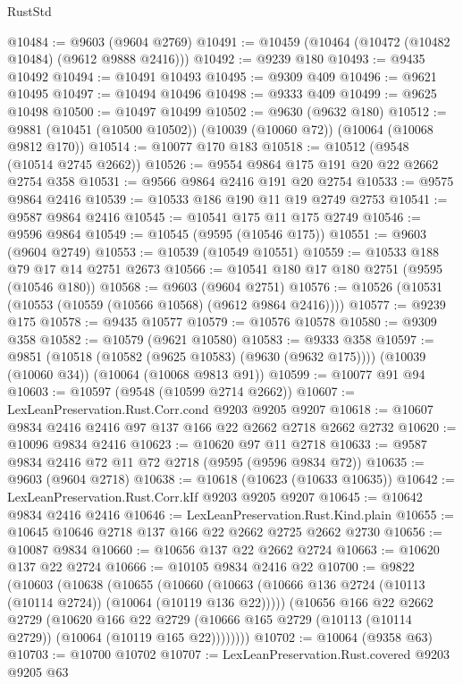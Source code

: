 \begin{lexlean}{RustStd}
\begin{coremodule}
@10484 := @9603 (@9604 @2769)
@10491 := @10459 (@10464 (@10472 (@10482 @10484) (@9612 @9888 @2416)))
@10492 := @9239 @180
@10493 := @9435 @10492
@10494 := @10491 @10493
@10495 := @9309 @409
@10496 := @9621 @10495
@10497 := @10494 @10496
@10498 := @9333 @409
@10499 := @9625 @10498
@10500 := @10497 @10499
@10502 := @9630 (@9632 @180)
@10512 := @9881 (@10451 (@10500 @10502)) (@10039 (@10060 @72)) (@10064 (@10068 @9812 @170))
@10514 := @10077 @170 @183
@10518 := @10512 (@9548 (@10514 @2745 @2662))
@10526 := @9554 @9864 @175 @191 @20 @22 @2662 @2754 @358
@10531 := @9566 @9864 @2416 @191 @20 @2754
@10533 := @9575 @9864 @2416
@10539 := @10533 @186 @190 @11 @19 @2749 @2753
@10541 := @9587 @9864 @2416
@10545 := @10541 @175 @11 @175 @2749
@10546 := @9596 @9864
@10549 := @10545 (@9595 (@10546 @175))
@10551 := @9603 (@9604 @2749)
@10553 := @10539 (@10549 @10551)
@10559 := @10533 @188 @79 @17 @14 @2751 @2673
@10566 := @10541 @180 @17 @180 @2751 (@9595 (@10546 @180))
@10568 := @9603 (@9604 @2751)
@10576 := @10526 (@10531 (@10553 (@10559 (@10566 @10568) (@9612 @9864 @2416))))
@10577 := @9239 @175
@10578 := @9435 @10577
@10579 := @10576 @10578
@10580 := @9309 @358
@10582 := @10579 (@9621 @10580)
@10583 := @9333 @358
@10597 := @9851
    (@10518 (@10582 (@9625 @10583) (@9630 (@9632 @175))))
    (@10039 (@10060 @34))
    (@10064 (@10068 @9813 @91))
@10599 := @10077 @91 @94
@10603 := @10597 (@9548 (@10599 @2714 @2662))
@10607 := LexLeanPreservation.Rust.Corr.cond @9203 @9205 @9207
@10618 := @10607 @9834 @2416 @2416 @97 @137 @166 @22 @2662 @2718 @2662 @2732
@10620 := @10096 @9834 @2416
@10623 := @10620 @97 @11 @2718
@10633 := @9587 @9834 @2416 @72 @11 @72 @2718 (@9595 (@9596 @9834 @72))
@10635 := @9603 (@9604 @2718)
@10638 := @10618 (@10623 (@10633 @10635))
@10642 := LexLeanPreservation.Rust.Corr.kIf @9203 @9205 @9207
@10645 := @10642 @9834 @2416 @2416
@10646 := LexLeanPreservation.Rust.Kind.plain
@10655 := @10645 @10646 @2718 @137 @166 @22 @2662 @2725 @2662 @2730
@10656 := @10087 @9834
@10660 := @10656 @137 @22 @2662 @2724
@10663 := @10620 @137 @22 @2724
@10666 := @10105 @9834 @2416 @22
@10700 := @9822
    (@10603
      (@10638
        (@10655
          (@10660 (@10663 (@10666 @136 @2724 (@10113 (@10114 @2724)) (@10064 (@10119 @136 @22)))))
          (@10656
            @166
            @22
            @2662
            @2729
            (@10620
              @166
              @22
              @2729
              (@10666 @165 @2729 (@10113 (@10114 @2729)) (@10064 (@10119 @165 @22))))))))
@10702 := @10064 (@9358 @63)
@10703 := @10700 @10702
@10707 := LexLeanPreservation.Rust.covered @9203 @9205 @63

\end{coremodule}
\end{lexlean}
